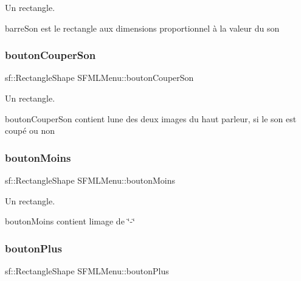 Un rectangle. 

barre\+Son est le rectangle aux dimensions proportionnel à la valeur du son \mbox{\label{class_s_f_m_l_menu_a2db59c62a6ba0fbd36ed5d62668f0429}} 
\subsubsection{\texorpdfstring{bouton\+Couper\+Son}{boutonCouperSon}}
{\footnotesize\ttfamily sf\+::\+Rectangle\+Shape S\+F\+M\+L\+Menu\+::bouton\+Couper\+Son\hspace{0.3cm}{\ttfamily [private]}}



Un rectangle. 

bouton\+Couper\+Son contient l\textquotesingle{}une des deux images du haut parleur, si le son est coupé ou non \mbox{\label{class_s_f_m_l_menu_a1e2ef0f6fcd9d526cdd778a04a7fc636}} 
\subsubsection{\texorpdfstring{bouton\+Moins}{boutonMoins}}
{\footnotesize\ttfamily sf\+::\+Rectangle\+Shape S\+F\+M\+L\+Menu\+::bouton\+Moins\hspace{0.3cm}{\ttfamily [private]}}



Un rectangle. 

bouton\+Moins contient l\textquotesingle{}image de \char`\"{}-\/\char`\"{} \mbox{\label{class_s_f_m_l_menu_aeb1bec14619d34e543cd51154bd20867}} 
\subsubsection{\texorpdfstring{bouton\+Plus}{boutonPlus}}
{\footnotesize\ttfamily sf\+::\+Rectangle\+Shape S\+F\+M\+L\+Menu\+::bouton\+Plus\hspace{0.3cm}{\ttfamily [private]}}




